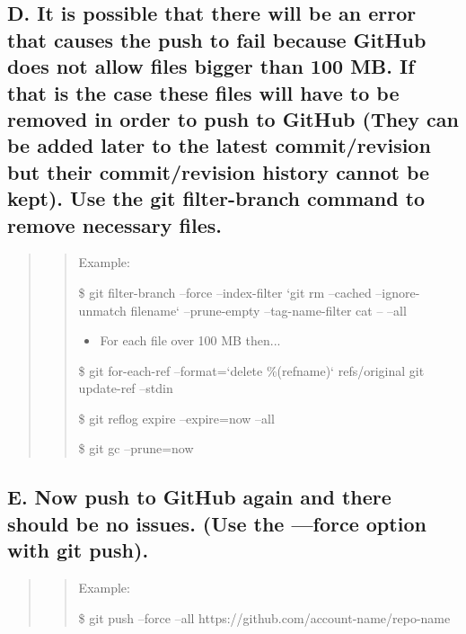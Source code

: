 \documentclass[letterpaper,10pt,english]{sphinxmanual}
\begin{document}
\subsection{D. It is possible that there will be an error that causes the push to fail because GitHub    does not allow files bigger than 100 MB. If that is the case these files will have to be removed in order to push to GitHub (They can be added later to the latest commit/revision but their commit/revision history cannot be kept). Use the git filter-branch command to remove necessary files.}
\label{docs/Process:d-it-is-possible-that-there-will-be-an-error-that-causes-the-push-to-fail-because-github-does-not-allow-files-bigger-than-100-mb-if-that-is-the-case-these-files-will-have-to-be-removed-in-order-to-push-to-github-they-can-be-added-later-to-the-latest-commit-revision-but-their-commit-revision-history-cannot-be-kept-use-the-git-filter-branch-command-to-remove-necessary-files}\begin{quote}
\begin{quote}

Example:

\$ git filter-branch --force --index-filter `git rm --cached --ignore-unmatch filename` --prune-empty --tag-name-filter cat -- --all
\begin{itemize}
\item {} 
For each file over 100 MB then...

\end{itemize}

\$ git for-each-ref --format=`delete \%(refname)` refs/original \textbar{} git update-ref --stdin

\$ git reflog expire --expire=now --all

\$ git gc --prune=now
\end{quote}
\end{quote}


\subsection{E. Now push to GitHub again and there should be no issues. (Use the —force option with git push).}
\label{docs/Process:e-now-push-to-github-again-and-there-should-be-no-issues-use-the-force-option-with-git-push}\begin{quote}
\begin{quote}

Example:

\$ git push --force --all  https://github.com/account-name/repo-name
\end{quote}
\end{quote}
\end{document}
